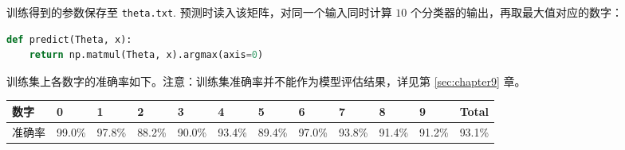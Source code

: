 训练得到的参数保存至 \texttt{theta.txt}. 预测时读入该矩阵，对同一个输入同时计算 $10$ 个分类器的输出，再取最大值对应的数字：

\begin{lstlisting}[language=Python]
def predict(Theta, x):
	return np.matmul(Theta, x).argmax(axis=0)
\end{lstlisting}

训练集上各数字的准确率如下。注意：训练集准确率并不能作为模型评估结果，详见第 \ref{sec:chapter9} 章。

\begin{table}[H]
    \centering
    \small
    \begin{tabularx}{\linewidth}{lYYYYYYYYYYY}
    \toprule
    数字 & 0 & 1 & 2 & 3 & 4 & 5 & 6 & 7 & 8 & 9 & Total \\
    \midrule
    准确率 & 99.0\% & 97.8\% & 88.2\% & 90.0\% & 93.4\% & 89.4\% & 97.0\% & 93.8\% & 91.4\% & 91.2\% & 93.1\% \\
    \bottomrule
    \end{tabularx}
\end{table}
